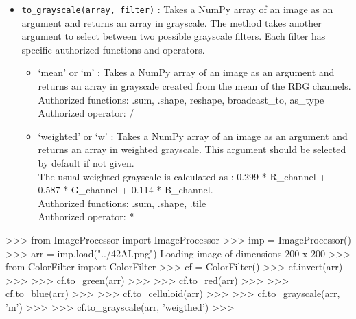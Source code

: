 \documentclass[]{article}
\newenvironment{Shaded}{\begin{snugshade}}{\end{snugshade}}
\newcommand{\DecValTok}[1]{\textcolor[rgb]{0.96,0.45,0.00}{#1}}
\newcommand{\ImportTok}[1]{\textcolor[rgb]{0.15,0.68,0.38}{#1}}
\newcommand{\NormalTok}[1]{\textcolor[rgb]{0.81,0.81,0.76}{#1}}
\newcommand{\OperatorTok}[1]{\textcolor[rgb]{0.81,0.81,0.76}{#1}}
\newcommand{\StringTok}[1]{\textcolor[rgb]{0.96,0.31,0.31}{#1}}
\begin{document}
\begin{itemize}
\item
  \texttt{to\_grayscale(array,\ filter)} : Takes a NumPy array of an
  image as an argument and returns an array in grayscale. The method
  takes another argument to select between two possible grayscale
  filters. Each filter has specific authorized functions and operators.

  \begin{itemize}
  \item
    `mean' or `m' : Takes a NumPy array of an image as an argument and
    returns an array in grayscale created from the mean of the RBG
    channels.\\
    Authorized functions: .sum, .shape, reshape, broadcast\_to,
    as\_type\\
    Authorized operator: /
  \item
    `weighted' or `w' : Takes a NumPy array of an image as an argument
    and returns an array in weighted grayscale. This argument should be
    selected by default if not given.\\
    The usual weighted grayscale is calculated as : 0.299 * R\_channel +
    0.587 * G\_channel + 0.114 * B\_channel.\\
    Authorized functions: .sum, .shape, .tile\\
    Authorized operator: *
  \end{itemize}
\end{itemize}

\begin{Shaded}
\begin{Highlighting}[]
\OperatorTok{>>>} \ImportTok{from}\NormalTok{ ImageProcessor }\ImportTok{import}\NormalTok{ ImageProcessor}
\OperatorTok{>>>}\NormalTok{ imp }\OperatorTok{=}\NormalTok{ ImageProcessor()}
\OperatorTok{>>>}\NormalTok{ arr }\OperatorTok{=}\NormalTok{ imp.load(}\StringTok{"../42AI.png"}\NormalTok{)}
\NormalTok{Loading image of dimensions }\DecValTok{200}\NormalTok{ x }\DecValTok{200}
\OperatorTok{>>>} \ImportTok{from}\NormalTok{ ColorFilter }\ImportTok{import}\NormalTok{ ColorFilter}
\OperatorTok{>>>}\NormalTok{ cf }\OperatorTok{=}\NormalTok{ ColorFilter()}
\OperatorTok{>>>}\NormalTok{ cf.invert(arr)}
\OperatorTok{>>>}
\OperatorTok{>>>}\NormalTok{ cf.to_green(arr)}
\OperatorTok{>>>}
\OperatorTok{>>>}\NormalTok{ cf.to_red(arr)}
\OperatorTok{>>>}
\OperatorTok{>>>}\NormalTok{ cf.to_blue(arr)}
\OperatorTok{>>>}
\OperatorTok{>>>}\NormalTok{ cf.to_celluloid(arr)}
\OperatorTok{>>>}
\OperatorTok{>>>}\NormalTok{ cf.to_grayscale(arr, }\StringTok{'m'}\NormalTok{)}
\OperatorTok{>>>}
\OperatorTok{>>>}\NormalTok{ cf.to_grayscale(arr, }\StringTok{'weigthed'}\NormalTok{)}
\OperatorTok{>>>}
\end{Highlighting}
\end{Shaded}
\end{document}
